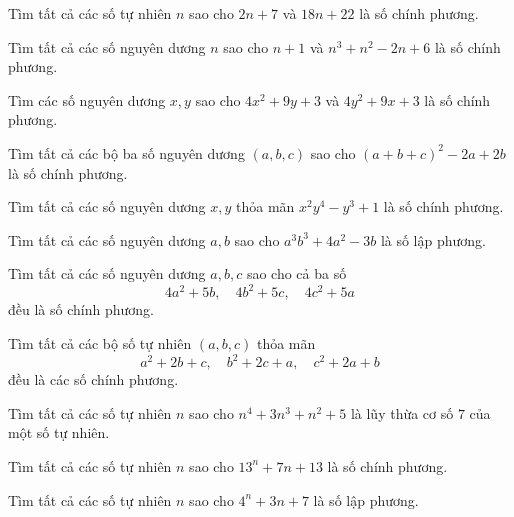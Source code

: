 \begin{btt}
Tìm tất cả các số tự nhiên $n$ sao cho $2n+7$ và $18n+22$ là số chính phương.
\end{btt}

\begin{btt}
Tìm tất cả các số nguyên dương $n$ sao cho $n+1$ và $n^3+n^2-2n+6$ là số chính phương.
\end{btt}

\begin{btt}
Tìm các số nguyên dương $x,y$ sao cho $4x^2+9y+3$ và $4y^2+9x+3$ là số chính phương.
\end{btt}

\begin{btt}
Tìm tất cả các bộ ba số nguyên dương $(a,b,c)$ sao cho $(a+b+c)^2-2a+2b$ là số chính phương.
\end{btt}

\begin{btt}
Tìm tất cả các số nguyên dương $x,y$ thỏa mãn $x^2y^4-y^3+1$ là số chính phương.
\end{btt}

\begin{btt}
Tìm tất cả các số nguyên dương $a,b$ sao cho $a^3b^3+4a^2-3b$ là số lập phương.
\end{btt}

\begin{btt}
Tìm tất cả các số nguyên dương $a, b, c$ sao cho cả ba số
$$4a^2+5b,\quad 4b^2+5c,\quad 4c^2+5a$$ 
đều là số chính phương.
\end{btt}

\begin{btt}
Tìm tất cả các bộ số tự nhiên \(\left ( a,b,c \right )\) thỏa mãn
\[a^2+2b+c,\quad b^2+2c+a,\quad c^2+2a+b\]
đều là các số chính phương.
\end{btt}

\begin{btt}
Tìm tất cả các số tự nhiên $n$ sao cho $n^4+3n^3+n^2+5$ là lũy thừa cơ số $7$ của một số tự nhiên.
\end{btt}

\begin{btt}
Tìm tất cả các số tự nhiên $n$ sao cho $13^n+7n+13$ là số chính phương.
\end{btt}

\begin{btt}
Tìm tất cả các số tự nhiên $n$ sao cho $4^n+3n+7$ là số lập phương.
\end{btt}

